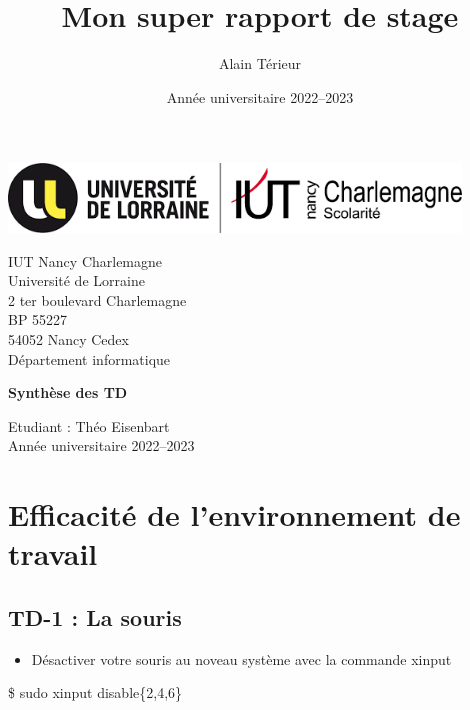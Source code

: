 \documentclass[12pt]{article}
\title{Mon super rapport de stage}
\author{Alain Térieur}
\date{Année universitaire 2022--2023}
\begin{document}
\thispagestyle{empty}
\begin{center}
  \includegraphics[width=12cm]{Logo_IUT-UL_dept_info.png}
\end{center}

\vspace{1cm}

\noindent
{\large
  IUT Nancy Charlemagne\\
  Université de Lorraine\\
  2 ter boulevard Charlemagne\\
  BP 55227\\
  54052 Nancy Cedex\\[5mm]
  Département informatique
}

\vspace{5cm}

\begin{center}
  {\huge
    \textbf{Synthèse des TD}
  }
\end{center}

\vspace{5cm}

\vfill

{\Large
  \noindent
  Etudiant : Théo Eisenbart\\
  Année universitaire 2022--2023
}
\newpage
\thispagestyle{empty}
\mbox{}
\newpage

\newpage
\tableofcontents

\newpage

\section{Efficacité de l'environnement de travail}

	\subsection{TD-1 : La souris}

\begin{itemize}
	\item Désactiver votre souris au noveau système avec la commande xinput
\end{itemize}

\vspace{0.3cm}
\$ sudo xinput disable\{2,4,6\}
\vspace{0.3cm}
\end{document}

